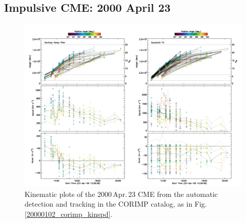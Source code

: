 \documentclass[referee,a4paper,12pt,traditabstract]{swsc}
\begin{document}
\subsection{Impulsive CME: 2000 April 23}


\begin{figure}[t]
\centerline{\includegraphics[width=\linewidth]{20000423_corimp_kinspd.pdf}}
\caption{Kinematic plots of the 2000\,Apr.\,23 CME from the automatic detection and tracking in the CORIMP catalog, as in Fig.\,\ref{20000102_corimp_kinspd}.}
\label{20000423_corimp_kinspd}
\end{figure}
\end{document}
